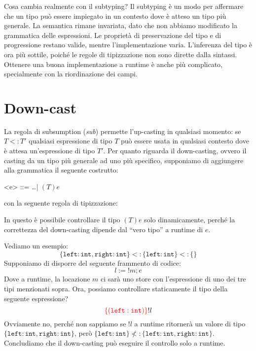 Cosa cambia realmente con il subtyping? Il subtyping è un modo
per affermare che un tipo può essere impiegato in un contesto
dove è atteso un tipo più generale. La semantica rimane invariata,
dato che non abbiamo modificato la grammatica delle espressioni.
Le proprietà di preservazione del tipo e di progressione restano
valide, mentre l'implementazione varia. L'inferenza del tipo è 
ora più sottile, poiché 
le regole di tipizzazione non sono dirette dalla sintassi. Ottenere 
una buona implementazione a runtime è anche più complicato, specialmente con 
la riordinazione dei campi.
\section{Down-cast}
La regola di subsumption (\textit{sub}) permette l'up-casting in qualsiasi 
momento: se $T <: T'$ qualsiasi espressione di tipo $T$
può essere usata in qualsiasi contesto dove è attesa un'espressione di tipo $T'$.
Per quanto riguarda il down-casting,
ovvero il casting da un tipo più generale ad uno più specifico, supponiamo 
di aggiungere alla grammatica il seguente costrutto:
\begin{grammar}
    <e> ::= \dots | $(T)e$
\end{grammar}
con la seguente regola di tipizzazione:
\begin{prooftree}
\end{prooftree}
In questo è possibile controllare il tipo $(T)e$ solo dinamicamente, 
perché la correttezza del down-casting dipende dal ``vero tipo'' a 
runtime di $e$.

Vediamo un esempio:
\[
    \{\texttt{left} : \texttt{int}, \texttt{right} : \texttt{int}\}
    <: \{\texttt{left} : \texttt{int} \}<:\{\}
\]
Supponiamo di disporre del seguente frammento di codice:
\[
  l := !m;e  
\]
Dove a runtime, la locazione $m$ ci sarà uno store con l'espressione di uno dei tre 
tipi menzionati sopra. Ora, possiamo controllare staticamente il tipo della seguente 
espressione?
\[
    \textcolor{red}{\{(\texttt{left} : \texttt{int})\}}!l
\]
Ovviamente no, perché non sappiamo se $!l$ a runtime ritornerà un valore di tipo
$\{\texttt{left} : \texttt{int}, \texttt{right} : \texttt{int}\}$, però 
$\{\texttt{left} : \texttt{int}\} \not <: 
\{\texttt{left} : \texttt{int}, \texttt{right} : \texttt{int}\}$. Concludiamo 
che il down-casting può eseguire il controllo solo a runtime.
